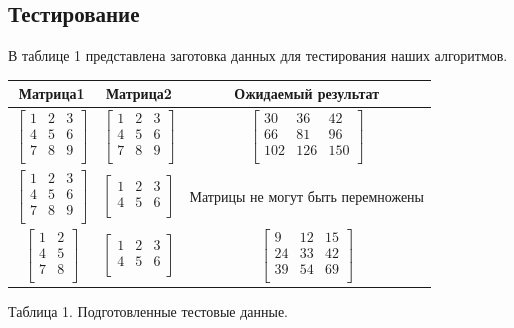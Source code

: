 \documentclass[a4paper,14pt]{article} %
\begin{document}
        
	\subsection{Тестирование}
	\hfill
	
	В таблице 1 представлена заготовка данных для тестирования наших алгоритмов. 
	\begin{center}
		\begin{tabular}{  | c | c | c | }
			\hline
			\textbf{Матрица1} & \textbf{Матрица2} & \textbf{Ожидаемый результат} \\ \hline
			$\begin{bmatrix} 
   			1&2&3 \\
    			4&5&6 \\ 
   			7&8&9 \\ 
			\end{bmatrix}$ & 
			$\begin{bmatrix} 
   			1&2&3 \\
    			4&5&6 \\ 
   			7&8&9 \\ 
			\end{bmatrix}$ &
			$\begin{bmatrix} 
   			30&36&42 \\
    			66&81&96 \\ 
   			102&126&150 \\ 
			\end{bmatrix} $ \\ \hline
			
			$\begin{bmatrix} 
   			1&2&3 \\
    			4&5&6 \\ 
   			7&8&9 \\ 
			\end{bmatrix}$ & 
			$\begin{bmatrix} 
   			1&2&3 \\
    			4&5&6 \\ 
			\end{bmatrix}$ &
			$\text{Матрицы не могут быть перемножены}$ \\ \hline
			
			$\begin{bmatrix} 
   			1&2 \\
    			4&5 \\ 
   			7&8 \\ 
			\end{bmatrix}$ & 
			$\begin{bmatrix} 
   			1&2&3 \\
    			4&5&6 \\ 
			\end{bmatrix}$ &
			$\begin{bmatrix} 
   			9&12&15 \\
    			24&33&42 \\ 
   			39&54&69 \\ 
			\end{bmatrix} $ \\ \hline
		\end{tabular}
		
		\hfill
		
		Таблица 1.
		Подготовленные тестовые данные.  
	\end{center}
	
\end{document}
